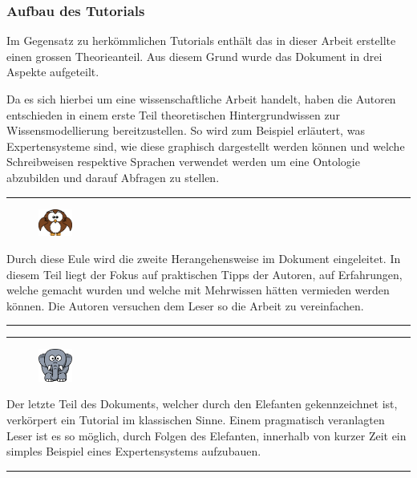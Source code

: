 \subsubsection{Aufbau des Tutorials}
\label{subsec:dokumentation_wissensmodellierung_aufbau}
Im Gegensatz zu herkömmlichen Tutorials enthält das in dieser Arbeit erstellte einen grossen Theorieanteil. Aus diesem Grund wurde das Dokument in drei Aspekte aufgeteilt.

Da es sich hierbei um eine wissenschaftliche Arbeit handelt, haben die Autoren entschieden in einem erste Teil theoretischen Hintergrundwissen zur Wissensmodellierung bereitzustellen. So wird zum Beispiel erläutert, was Expertensysteme sind, wie diese graphisch dargestellt werden können und welche Schreibweisen respektive Sprachen verwendet werden um eine Ontologie abzubilden und darauf Abfragen zu stellen.

\noindent\rule[1ex]{\textwidth}{1pt}
\begin{figure}
    \vspace{-18pt}
    \includegraphics[width=0.1\textwidth]{bilder/owl.png}
\end{figure}
Durch diese Eule wird die zweite Herangehensweise im Dokument eingeleitet. In diesem Teil liegt der Fokus auf praktischen Tipps der Autoren, auf Erfahrungen, welche gemacht wurden und welche mit Mehrwissen hätten vermieden werden können. Die Autoren versuchen dem Leser so die Arbeit zu vereinfachen.\\
\noindent\rule[1ex]{\textwidth}{1pt}

\noindent\rule[1ex]{\textwidth}{1pt}
\begin{figure}
    \vspace{-18pt}
    \includegraphics[width=0.1\textwidth]{bilder/elephant.png}
\end{figure}
Der letzte Teil des Dokuments, welcher durch den Elefanten gekennzeichnet ist, verkörpert ein Tutorial im klassischen Sinne. Einem pragmatisch veranlagten Leser ist es so möglich, durch Folgen des Elefanten, innerhalb von kurzer Zeit ein simples Beispiel eines Expertensystems aufzubauen.\\
\noindent\rule[1ex]{\textwidth}{1pt}

